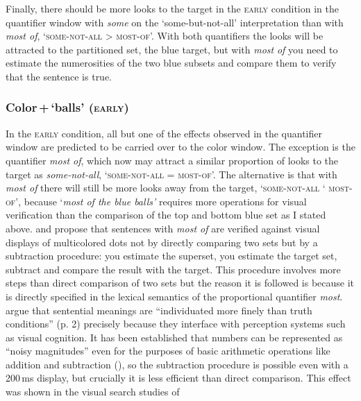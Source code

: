 \documentclass[output=paper]{langscibook}
\begin{document}
Finally, there should be more looks to the target in the \textsc{early} condition in the quantifier window with \textit{some} on
the `some-but-not-all' interpretation than with \textit{most of}, `\textsc{some-not-all} {\textgreater}
\textsc{most-of}'. With both quantifiers the looks will be attracted to the partitioned set, the blue target, but with
\textit{most} \textit{of} you need to estimate the numerosities of the two blue subsets and compare them to verify that
the sentence is true.


\subsubsection{Color\,+\,`balls' (\textsc{early})}

In the \textsc{early} condition, all but one of the effects observed in the quantifier window are predicted to be carried over to
the color window. The exception is the quantifier \textit{most of}, which now may attract a similar proportion of looks
to the target as \textit{some-not-all}, `\textsc{some-not-all} = \textsc{most-of}'. The alternative is that with
\textit{most of} there will still be more looks away from the target, `\textsc{some-not-all} `
\textsc{most-of}', because `\textit{most of the blue balls'} requires more operations for
visual verification than the comparison of the top and bottom blue set as I stated above. \citet{pietroski2009meaning} and \citet{lidz2011interface} propose that sentences with \textit{most of} are verified against visual displays of
multicolored dots not by directly comparing two sets but by a subtraction procedure: you estimate the superset, you
estimate the target set, subtract and compare the result with the target. This procedure involves more steps than
direct comparison of two sets but the reason it is followed is because it is directly specified in the lexical
semantics of the proportional quantifier \textit{most}. \citet{lidz2011interface} argue that sentential meanings are
“individuated more finely than truth conditions” (p. 2) precisely because they interface with perception systems such
as visual cognition. It has been established that numbers can be represented as ``noisy magnitudes'' even for the
purposes of basic arithmetic operations like addition and subtraction (\citealt{feigenson2004core,degen2011making}), so the
subtraction procedure is possible even with a 200\,ms display, but crucially it is less efficient than direct comparison.
This effect was shown in the visual search studies of 
\end{document}
